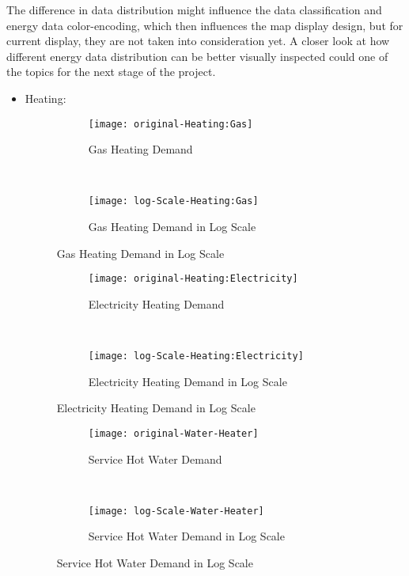 The difference in data distribution might influence the data
classification and energy data color-encoding, which then influences
the map display design, but for current display, they are not taken
into consideration yet. A closer look at how different energy data
distribution can be better visually inspected could one of the topics
for the next stage of the project.

\pagebreak
\begin{itemize}
\item Heating:

\begin{figure}[h!]
  \centering
  \begin{subfigure}{0.4\textwidth}
  \centering
  \texttt{[image: original-Heating:Gas]}
  \caption[Gas Heating Demand]{Gas Heating Demand}
  \label{fig:original-Heating:Gas}
\end{subfigure}
~
\begin{subfigure}{0.4\textwidth}
  \centering
  \texttt{[image: log-Scale-Heating:Gas]}
  \caption[Gas Heating Demand]{Gas Heating Demand in Log Scale}
  \label{fig:log-Scale-Heating:Gas}
\end{subfigure}
  \caption[Gas Heating Demand Log]{Gas Heating Demand in Log Scale}
\end{figure}

\begin{figure}[h!]
  \centering
  \begin{subfigure}{0.4\textwidth}
  \centering
  \texttt{[image: original-Heating:Electricity]}
  \caption[Electricity Heating Demand]{Electricity Heating Demand}
  \label{fig:original-Heating:Electricity}
\end{subfigure}
~
\begin{subfigure}{0.4\textwidth}
  \centering
  \texttt{[image: log-Scale-Heating:Electricity]}
  \caption[Electricity Heating Demand]{Electricity Heating Demand in Log Scale}
  \label{fig:log-Scale-Heating:Electricity}
\end{subfigure}
  \caption[Electricity Heating Demand Log]{Electricity Heating Demand in Log Scale}
\end{figure}

\begin{figure}[h!]
  \centering
  \begin{subfigure}{0.4\textwidth}
  \centering
  \texttt{[image: original-Water-Heater]}
  \caption[Service Hot Water Demand]{Service Hot Water Demand}
  \label{fig:original-Water Heater}
\end{subfigure}
~
\begin{subfigure}{0.4\textwidth}
  \centering
  \texttt{[image: log-Scale-Water-Heater]}
  \caption[Service Hot Water Demand]{Service Hot Water Demand in Log Scale}
  \label{fig:log-Scale-Water-Heater}
\end{subfigure}
  \caption[Service Hot Water Demand Log]{Service Hot Water Demand in Log Scale}
\end{figure}


\end{itemize}
